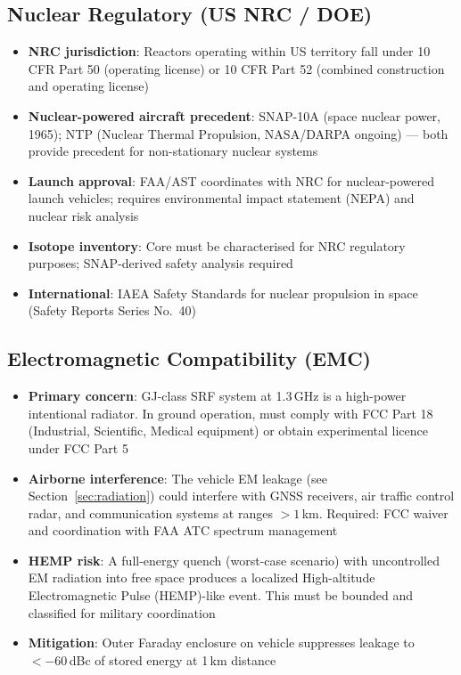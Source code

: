 \documentclass[11pt,a4paper]{article}
\begin{document}
\subsection{Nuclear Regulatory (US NRC / DOE)}

\begin{itemize}
  \item \textbf{NRC jurisdiction}: Reactors operating within US
    territory fall under 10 CFR Part 50 (operating license) or
    10 CFR Part 52 (combined construction and operating license)
  \item \textbf{Nuclear-powered aircraft precedent}: SNAP-10A
    (space nuclear power, 1965); NTP (Nuclear Thermal Propulsion,
    NASA/DARPA ongoing) --- both provide precedent for
    non-stationary nuclear systems
  \item \textbf{Launch approval}: FAA/AST coordinates with NRC
    for nuclear-powered launch vehicles; requires environmental
    impact statement (NEPA) and nuclear risk analysis
  \item \textbf{Isotope inventory}: Core must be characterised for
    NRC regulatory purposes; SNAP-derived safety analysis required
  \item \textbf{International}: IAEA Safety Standards for nuclear
    propulsion in space (Safety Reports Series No.~40)
\end{itemize}

\subsection{Electromagnetic Compatibility (EMC)}

\begin{itemize}
  \item \textbf{Primary concern}: GJ-class SRF system at 1.3\,GHz
    is a high-power intentional radiator. In ground operation,
    must comply with FCC Part 18 (Industrial, Scientific, Medical
    equipment) or obtain experimental licence under FCC Part 5
  \item \textbf{Airborne interference}: The vehicle EM leakage (see
    Section~\ref{sec:radiation}) could interfere with GNSS receivers,
    air traffic control radar, and communication systems at ranges
    $> 1$\,km. Required: FCC waiver and coordination with FAA
    ATC spectrum management
  \item \textbf{HEMP risk}: A full-energy quench (worst-case scenario)
    with uncontrolled EM radiation into free space produces a localized
    High-altitude Electromagnetic Pulse (HEMP)-like event. This must
    be bounded and classified for military coordination
  \item \textbf{Mitigation}: Outer Faraday enclosure on vehicle
    suppresses leakage to $< -60$\,dBc of stored energy at
    1\,km distance
\end{itemize}
\end{document}
